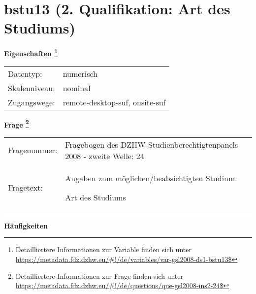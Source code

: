 
    \setcounter{footnote}{0}

    \vspace*{-1.8cm}
	\section{bstu13 (2. Qualifikation: Art des Studiums)}
	\label{section:bstu13}



    \vspace*{0.5cm}
    \noindent\textbf{Eigenschaften
	\footnote{Detailliertere Informationen zur Variable finden sich unter
		\url{https://metadata.fdz.dzhw.eu/\#!/de/variables/var-gsl2008-ds1-bstu13$}}}\\
	\begin{tabularx}{\hsize}{@{}lX}
	Datentyp: & numerisch \\
	Skalenniveau: & nominal \\
	Zugangswege: &
	  remote-desktop-suf, 
	  onsite-suf
 \\
    \end{tabularx}



				\vspace*{0.5cm}
                \noindent\textbf{Frage
	                \footnote{Detailliertere Informationen zur Frage finden sich unter
		              \url{https://metadata.fdz.dzhw.eu/\#!/de/questions/que-gsl2008-ins2-24$}}}\\
				\begin{tabularx}{\hsize}{@{}lX}
					Fragenummer: &
					  Fragebogen des DZHW-Studienberechtigtenpanels 2008 - zweite Welle:
					  24
 \\
					Fragetext: & Angaben zum möglichen/beabsichtigten Studium:\par  Art des Studiums \\
				\end{tabularx}





        		\vspace*{0.5cm}
                \noindent\textbf{Häufigkeiten}

